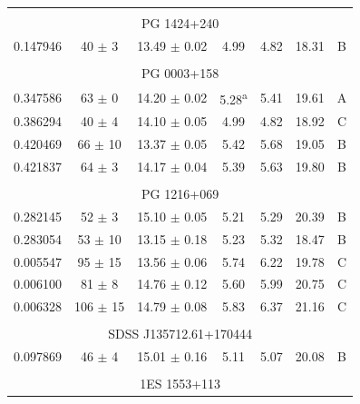 \begin{longtable}{ccccccc}
            \hline \tabularnewline

            \multicolumn{7}{c}{PG 1424+240} \\ \hline 

            0.147946  &  40 $\pm$ 3  &  13.49 $\pm$ 0.02  &  4.99  &  4.82  &  18.31  &  B \\

            \hline \tabularnewline

            \multicolumn{7}{c}{PG 0003+158} \\ \hline 

            0.347586  &  63 $\pm$ 0  &  14.20 $\pm$ 0.02  &  5.28\textsuperscript{a}  &  5.41  &  19.61  &  A \\
            0.386294  &  40 $\pm$ 4  &  14.10 $\pm$ 0.05  &  4.99  &  4.82  &  18.92  &  C \\
            0.420469  &  66 $\pm$ 10  &  13.37 $\pm$ 0.05  &  5.42  &  5.68  &  19.05  & B  \\
            0.421837  &  64 $\pm$ 3  &  14.17 $\pm$ 0.04  &  5.39  &  5.63  &  19.80  & B  \\

            \hline \tabularnewline

            \multicolumn{7}{c}{PG 1216+069} \\ \hline 

            0.282145  &  52 $\pm$ 3  &  15.10 $\pm$ 0.05  &  5.21  &  5.29  &  20.39  &  B \\
            0.283054  &  53 $\pm$ 10  &  13.15 $\pm$ 0.18  &  5.23  &  5.32  &  18.47  &  B \\
            0.005547  &  95 $\pm$ 15  &  13.56 $\pm$ 0.06  &  5.74  &  6.22  &  19.78  &  C \\
            0.006100  &  81 $\pm$ 8  &  14.76 $\pm$ 0.12  &  5.60  &  5.99  &  20.75  &  C \\
            0.006328  &  106 $\pm$ 15  &  14.79 $\pm$ 0.08  &  5.83  &  6.37  &  21.16  &  C \\

            \hline \tabularnewline

            \multicolumn{7}{c}{SDSS J135712.61+170444} \\ \hline 

            0.097869  &  46 $\pm$ 4  &  15.01 $\pm$ 0.16  &  5.11  &  5.07  &  20.08  &  B \\

            \hline \tabularnewline

            \multicolumn{7}{c}{1ES 1553+113} \\ \hline 


\end{longtable}
